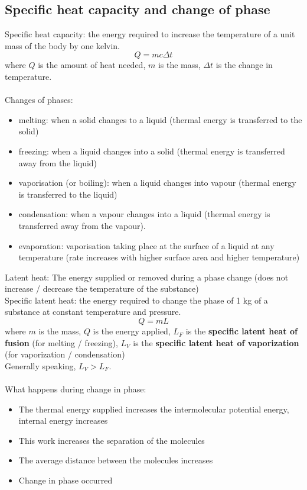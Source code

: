 \documentclass[a4paper,12pt]{article}
\begin{document}
\subsection{Specific heat capacity and change of phase}
Specific heat capacity: the energy required to increase the temperature of a unit mass of the body by one kelvin.
\[Q=mc\Delta t\]
where $Q$ is the amount of heat needed, $m$ is the mass, $\Delta t$ is the change in temperature.\\\\
Changes of phases:
\begin{itemize}
  \item melting: when a solid changes to a liquid (thermal energy is transferred to the solid)
  \item freezing: when a liquid changes into a solid (thermal energy is transferred away from the liquid)
  \item vaporisation (or boiling): when a liquid changes into vapour (thermal energy is transferred to the liquid)
  \item condensation: when a vapour changes into a liquid (thermal energy is transferred away from the vapour).
  \item evaporation: vaporisation taking place at the surface of a liquid at any temperature (rate increases with higher surface area and higher temperature)
\end{itemize}
Latent heat: The energy supplied or removed during a phase change (does not increase / decrease the temperature of the substance)\\
Specific latent heat: the energy required to change the phase of 1 kg of a substance at constant temperature and pressure.
\[Q=mL\]
where $m$ is the mass, $Q$ is the energy applied, $L_F$ is the \textbf{specific latent heat of fusion} (for melting / freezing), $L_V$ is the \textbf{specific latent heat of vaporization} (for vaporization / condensation)\\
Generally speaking, $L_V>L_F$.\\\\
What happens during change in phase:
\begin{itemize}
  \item The thermal energy supplied increases the intermolecular potential energy, internal energy increases
  \item This work increases the separation of the molecules
  \item The average distance between the molecules increases
  \item Change in phase occurred
\end{itemize}
\end{document}
